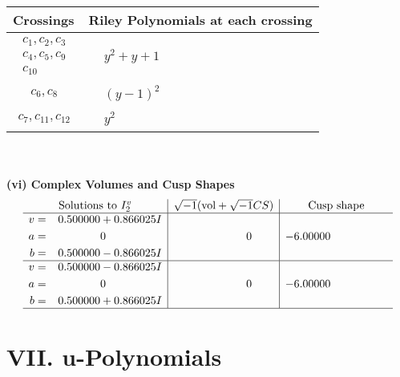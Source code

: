 \documentclass[1p]{elsarticle_modified}
\theoremstyle{definition}
\newcommand{\I}{\sqrt{-1}}
\begin{document}
\begin{tabular}{m{50pt}|m{274pt}}
Crossings & \hspace{64pt}Riley Polynomials at each crossing \\
\hline $$\begin{aligned}c_{1},c_{2},c_{3}\\c_{4},c_{5},c_{9}\\c_{10}\end{aligned}$$&$\begin{aligned}
&y^2+y+1
\end{aligned}$\\
\hline $$\begin{aligned}c_{6},c_{8}\end{aligned}$$&$\begin{aligned}
&(y-1)^2
\end{aligned}$\\
\hline $$\begin{aligned}c_{7},c_{11},c_{12}\end{aligned}$$&$\begin{aligned}
&y^2
\end{aligned}$\\
\hline
\end{tabular}\\~\\
\newpage\flushleft \textbf{(vi) Complex Volumes and Cusp Shapes}
$$\begin{array}{c|c|c}  
\text{Solutions to }I^v_{2}& \I (\text{vol} + \sqrt{-1}CS) & \text{Cusp shape}\\
 \hline 
\begin{aligned}
v &= \phantom{-}0.500000 + 0.866025 I \\
a &= \phantom{-0.000000 } 0 \\
b &= \phantom{-}0.500000 - 0.866025 I\end{aligned}
 & \phantom{-0.000000 } 0 & -6.00000\phantom{ +0.000000I} \\ \hline\begin{aligned}
v &= \phantom{-}0.500000 - 0.866025 I \\
a &= \phantom{-0.000000 } 0 \\
b &= \phantom{-}0.500000 + 0.866025 I\end{aligned}
 & \phantom{-0.000000 } 0 & -6.00000\phantom{ +0.000000I}\\
 \hline 
 \end{array}$$\newpage
\newpage\renewcommand{\arraystretch}{1}
\centering \section*{ VII. u-Polynomials}
\end{document}
